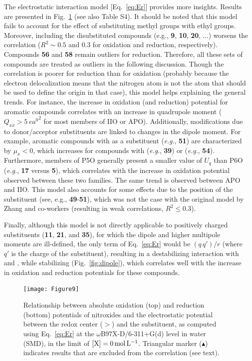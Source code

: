 \documentclass[review,preprint]{elsarticle}
\begin{document}
The electrostatic interaction model [Eq.~\eqref{eq:Er}] provides more insights. Results are presented in Fig.~\ref{fig:corr} (see also Table S4). It should be noted that this model fails to account for the effect of substituting methyl groups with ethyl groups. Moreover, including the disubstituted compounds (e.g., \textbf{9}, \textbf{10}, \textbf{20}, ...) worsens the correlation ($R^2 \sim 0.5$ and 0.3 for oxidation and reduction, respectively). Compounds \textbf{56} and \textbf{58} remain outliers for reduction. Therefore, all these sets of compounds are treated as outliers in the following discussion.
Though the correlation is poorer for reduction than for oxidation (probably because the electron delocalization means that the nitrogen atom is not the atom that should be used to define the origin in that case), this model helps explaining the general trends. For instance, the increase in oxidation (and reduction) potential for aromatic compounds correlates with an increase in quadrupole moment ($Q_{xx} > \SI{5}{\elementarycharge\bohr\squared}$ for most members of IIO or APO). Additionally, modifications due to donor/acceptor substituents are linked to changes in the dipole moment. For example, aromatic compounds with  as a substituent (\textit{e.g.}, \textbf{51}) are characterized by $\mu_{x} < 0$, which increases for compounds with  (\textit{e.g.}, \textbf{39}) or  (\textit{e.g.}, \textbf{54}). Furthermore, members of P5O generally present a smaller value of $U_q$ than P6O (\textit{e.g.}, \textbf{17} versus \textbf{5}), which correlates with the increase in oxidation potential observed between these two families. The same trend is observed between APO and IIO.
This model also accounts for some effects due to the position of the substituent (see, e.g., \textbf{49}-\textbf{51}), which was not the case with the original model by Zhang and co-workers (resulting in weak correlations, $R^2 \leq 0.3$). 

Finally, although this model is not directly applicable to positively charged substituents (\textbf{11}, \textbf{21}, and \textbf{35}), for which the dipole and higher multipole moments are ill-defined, the only term of Eq.~\eqref{eq:Er}  would be $(q\,q')/r$ (where $q'$ is the charge of the substituent), resulting in a destabilizing interaction with  and , while stabilizing  (Fig.~\ref{fig:dipole}), which correlates well with the increase in oxidation and reduction potentials for these compounds.


\begin{figure}[!h]
\centering
\texttt{[image: Figure9]}
\caption{Relationship between absolute oxidation (top) and reduction (bottom) potentials of nitroxides and the electrostatic potential between the redox center ($>$) and the substituent, as computed using Eq.~\eqref{eq:Er} at the $\omega$B97X-D/6-311+G(d) level in water (SMD), in the limit of $[\ce{X}]=\SI{0}{\mole\per\liter}$. Triangular marker ($\blacktriangle$) indicates results that are excluded from the correlation (see text).}
\label{fig:corr} 
\end{figure}
\end{document}
